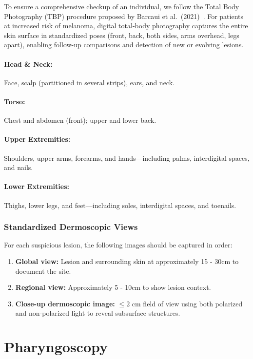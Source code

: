 To ensure a comprehensive checkup of an individual, we follow the Total Body Photography (TBP) procedure proposed by Barcaui et al.~(2021)~\cite{tbp}. For patients at increased risk of melanoma, digital total-body photography captures the entire skin surface in standardized poses (front, back, both sides, arms overhead, legs apart), enabling follow-up comparisons and detection of new or evolving lesions.

\paragraph{Head \& Neck:} Face, scalp (partitioned in several strips), ears, and neck.
\paragraph{Torso:} Chest and abdomen (front); upper and lower back.
\paragraph{Upper Extremities:} Shoulders, upper arms, forearms, and hands—including palms, interdigital spaces, and nails.
\paragraph{Lower Extremities:} Thighs, lower legs, and feet—including soles, interdigital spaces, and toenails.

\subsubsection*{Standardized Dermoscopic Views}
For each suspicious lesion, the following images should be captured in order:

\begin{enumerate}
    \item \textbf{Global view:} Lesion and surrounding skin at approximately 15 - 30cm to document the site.
    \item \textbf{Regional view:} Approximately 5 - 10cm to show lesion context.
    \item \textbf{Close-up dermoscopic image:} $\leq$2 cm field of view using both polarized and non-polarized light to reveal subsurface structures.
\end{enumerate}


\section{Pharyngoscopy}

